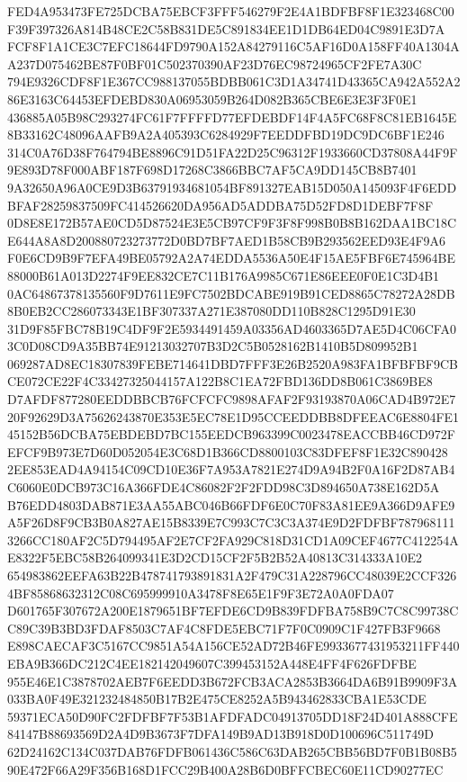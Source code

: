 \documentclass[UTF8,fontset=fandol,zihao=-4,a4paper]{ctexart}
\begin{document}
{{FED4A953473FE725DCBA75EBCF3FFF546279F2E4A1BDFBF8F1E323468C00F39F397326A814B48CE2C58B831DE5C891834EE1D1DB64ED04C9891E3D7A
FCF8F1A1CE3C7EFC18644FD9790A152A84279116C5AF16D0A158FF40A1304AA237D075462BE87F0BF01C502370390AF23D76EC98724965CF2FE7A30C
794E9326CDF8F1E367CC988137055BDBB061C3D1A34741D43365CA942A552A286E3163C64453EFDEBD830A06953059B264D082B365CBE6E3E3F3F0E1
436885A05B98C293274FC61F7FFFFD77EFDEBDF14F4A5FC68F8C81EB1645E8B33162C48096AAFB9A2A405393C6284929F7EEDDFBD19DC9DC6BF1E246
314C0A76D38F764794BE8896C91D51FA22D25C96312F1933660CD37808A44F9F9E893D78F000ABF187F698D17268C3866BBC7AF5CA9DD145CB8B7401
9A32650A96A0CE9D3B63791934681054BF891327EAB15D050A145093F4F6EDDBFAF28259837509FC414526620DA956AD5ADDBA75D52FD8D1DEBF7F8F
0D8E8E172B57AE0CD5D87524E3E5CB97CF9F3F8F998B0B8B162DAA1BC18CE644A8A8D200880723273772D0BD7BF7AED1B58CB9B293562EED93E4F9A6
F0E6CD9B9F7EFA49BE05792A2A74EDDA5536A50E4F15AE5FBF6E745964BE88000B61A013D2274F9EE832CE7C11B176A9985C671E86EEE0F0E1C3D4B1
0AC64867378135560F9D7611E9FC7502BDCABE919B91CED8865C78272A28DB8B0EB2CC286073343E1BF307337A271E387080DD110B828C1295D91E30
31D9F85FBC78B19C4DF9F2E5934491459A03356AD4603365D7AE5D4C06CFA03C0D08CD9A35BB74E91213032707B3D2C5B0528162B1410B5D809952B1
069287AD8EC18307839FEBE714641DBD7FFF3E26B2520A983FA1BFBFBF9CBCE072CE22F4C33427325044157A122B8C1EA72FBD136DD8B061C3869BE8
D7AFDF877280EEDDBBCB76FCFCFC9898AFAF2F93193870A06CAD4B972E720F92629D3A75626243870E353E5EC78E1D95CCEEDDBB8DFEEAC6E8804FE1
45152B56DCBA75EBDEBD7BC155EEDCB963399C0023478EACCBB46CD972FEFCF9B973E7D60D052054E3C68D1B366CD8800103C83DFEF8F1E32C890428
2EE853EAD4A94154C09CD10E36F7A953A7821E274D9A94B2F0A16F2D87AB4C6060E0DCB973C16A366FDE4C86082F2F2FDD98C3D894650A738E162D5A
B76EDD4803DAB871E3AA55ABC046B66FDF6E0C70F83A81EE9A366D9AFE9A5F26D8F9CB3B0A827AE15B8339E7C993C7C3C3A374E9D2FDFBF787968111
3266CC180AF2C5D794495AF2E7CF2FA929C818D31CD1A09CEF4677C412254AE8322F5EBC58B264099341E3D2CD15CF2F5B2B52A40813C314333A10E2
654983862EEFA63B22B478741793891831A2F479C31A228796CC48039E2CCF3264BF85868632312C08C695999910A3478F8E65E1F9F3E72A0A0FDA07
D601765F307672A200E1879651BF7EFDE6CD9B839FDFBA758B9C7C8C99738CC89C39B3BD3FDAF8503C7AF4C8FDE5EBC71F7F0C0909C1F427FB3F9668
E898CAECAF3C5167CC9851A54A156CE52AD72B46FE9933677431953211FF440EBA9B366DC212C4EE182142049607C399453152A448E4FF4F626FDFBE
955E46E1C3878702AEB7F6EEDD3B672FCB3ACA2853B3664DA6B91B9909F3A033BA0F49E321232484850B17B2E475CE8252A5B943462833CBA1E53CDE
59371ECA50D90FC2FDFBF7F53B1AFDFADC04913705DD18F24D401A888CFE84147B88693569D2A4D9B3673F7DFA149B9AD13B918D0D100696C511749D
62D24162C134C037DAB76FDFB061436C586C63DAB265CBB56BD7F0B1B08B590E472F66A29F356B168D1FCC29B400A28B6D0BFFCBEC60E11CD90277EC
}}
\end{document}
